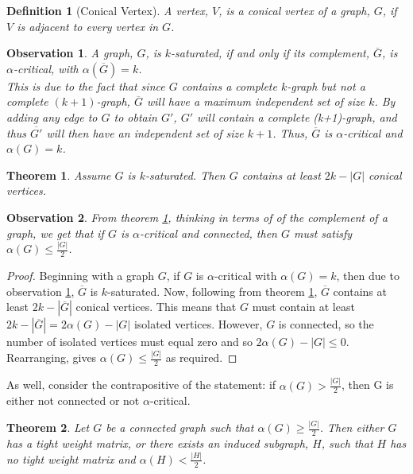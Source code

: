 \documentclass[12pt]{article}
\theoremstyle{parenbold}
\newtheorem{definition}{Definition}[section]
\newtheorem{observation}{Observation}[section]
\newtheorem{theorem}{Theorem}[section]
\begin{document}
\begin{definition}[Conical Vertex]
A vertex, $V$, is a conical vertex of a graph, $G$, if $V$ is adjacent to every vertex in $G$.
\end{definition}


\begin{observation} \label{obs-sat}
A graph, $G$, is $k$-saturated, if and only if its complement, $\overline{G}$, is $\alpha$-critical, with $\alpha(\overline{G})=k$. \\
This is due to the fact that since $G$ contains a complete $k$-graph but not a complete $(k+1)$-graph, $\overline{G}$ will have a maximum independent set of size $k$. By adding any edge to $G$ to obtain $G'$, $G'$ will contain a complete (k+1)-graph, and thus $\overline{G'}$ will then have an independent set of size $k+1$. Thus, $\overline{G}$ is $\alpha$-critical and $\alpha(G)=k$.
\end{observation}

\begin{theorem} \label{k-sat}
Assume $G$ is $k$-saturated. Then $G$ contains at least $2k - |G|$ conical vertices. \cite{kSaturated}
\end{theorem}

\begin{observation} \label{Contra}
From theorem \ref{k-sat}, thinking in terms of of the complement of a graph, we get that if $G$ is $\alpha$-critical and connected, then $G$ must satisfy $\alpha(G) \leq \frac{|G|}{2}$.
\end{observation}

\begin{proof}
Beginning with a graph $G$, if $G$ is $\alpha$-critical with $\alpha(G)=k$, then due to observation \ref{obs-sat}, $\overline{G}$ is $k$-saturated. Now, following from theorem \ref{k-sat}, $\overline{G}$ contains at least $2k - |\overline{G}|$ conical vertices. This means that $G$ must contain at least $2k - |\overline{G}| = 2\alpha(G) - |G|$ isolated vertices. However, $G$ is connected, so the number of isolated vertices must equal zero and so $2\alpha(G) - |G| \leq 0$. Rearranging, gives $\alpha(G) \leq \frac{|G|}{2}$ as required.
\end{proof}

As well, consider the contrapositive of the statement:
if $\alpha(G) > \frac{|G|}{2}$, then G is either not connected or not $\alpha$-critical.

\begin{theorem} \label{John's}
Let $G$ be a connected graph such that $\alpha(G) \geq \frac{|G|}{2}$. Then either $G$ has a tight weight matrix, or there exists an induced subgraph, $H$, such that $H$ has no tight weight matrix and $\alpha(H) < \frac{|H|}{2}$.
\end{theorem}
\end{document}
